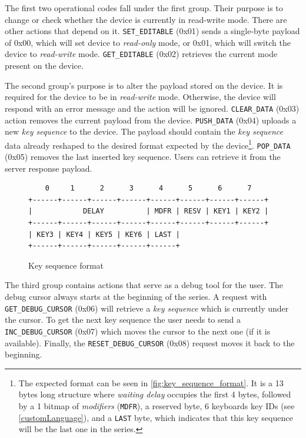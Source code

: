 The first two operational codes fall under the first group. Their purpose is to change or check whether the device is currently in read-write mode. There are other actions that depend on it. \verb|SET_EDITABLE| (0x01) sends a single-byte payload of 0x00, which will set device to \emph{read-only} mode, or 0x01, which will switch the device to \emph{read-write} mode. \verb|GET_EDITABLE| (0x02) retrieves the current mode present on the device.

The second group's purpose is to alter the payload stored on the device. It is required for the device to be in \emph{read-write} mode. Otherwise, the device will respond with an error message and the action will be ignored. \verb|CLEAR_DATA| (0x03) action removes the current payload from the device. \verb|PUSH_DATA| (0x04) uploads a new \emph{key sequence} to the device. The payload should contain the \emph{key sequence} data already reshaped to the desired format expected by the device\footnote{The expected format can be seen in \autoref{fig:key_sequence_format}. It is a 13 bytes long structure where \emph{waiting delay} occupies the first 4 bytes, followed by a 1 bitmap of \emph{modifiers} (\texttt{MDFR}), a reserved byte, 6 keyboards key IDs (see \autoref{customLanguage}), and a \texttt{LAST} byte, which indicates that this key sequence will be the last one in the series.}. \verb|POP_DATA| (0x05) removes the last inserted key sequence. Users can retrieve it from the server response payload.

\begin{figure}[ht]
\label{fig:key_sequence_format}
\centering
\begin{varwidth}{\linewidth}
\begin{verbatim}
    0     1      2      3      4      5      6      7   
+------+------+------+------+------+------+------+------+
|            DELAY          | MDFR | RESV | KEY1 | KEY2 |
+------+------+------+------+------+------+------+------+
| KEY3 | KEY4 | KEY5 | KEY6 | LAST |
+------+------+------+------+------+
\end{verbatim}
\end{varwidth}
\caption{Key sequence format}
\end{figure}

The third group contains actions that serve as a debug tool for the user. The debug cursor always starts at the beginning of the series. A request with \verb|GET_DEBUG_CURSOR| (0x06) will retrieve a \emph{key sequence} which is currently under the cursor. To get the next key sequence the user needs to send a \verb|INC_DEBUG_CURSOR| (0x07) which moves the cursor to the next one (if it is available). Finally, the \verb|RESET_DEBUG_CURSOR| (0x08) request moves it back to the beginning.

